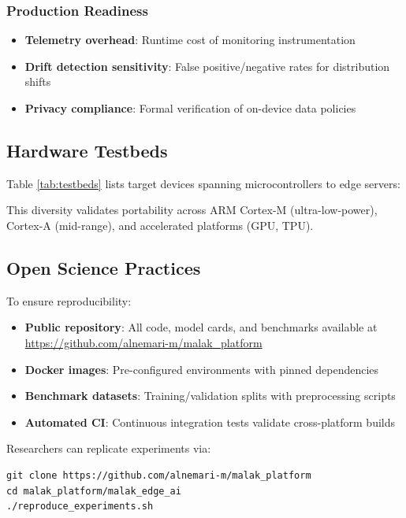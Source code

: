\subsubsection{Production Readiness}
\begin{itemize}
\item \textbf{Telemetry overhead}: Runtime cost of monitoring instrumentation
\item \textbf{Drift detection sensitivity}: False positive/negative rates for distribution shifts
\item \textbf{Privacy compliance}: Formal verification of on-device data policies
\end{itemize}

\subsection{Hardware Testbeds}

Table \ref{tab:testbeds} lists target devices spanning microcontrollers to edge servers:

\begin{table}[h]
\centering
\caption{Hardware Testbeds for Evaluation}
\label{tab:testbeds}
\end{table}

This diversity validates portability across ARM Cortex-M (ultra-low-power), Cortex-A (mid-range), and accelerated platforms (GPU, TPU).

\subsection{Open Science Practices}

To ensure reproducibility:
\begin{itemize}
\item \textbf{Public repository}: All code, model cards, and benchmarks available at \url{https://github.com/alnemari-m/malak_platform}
\item \textbf{Docker images}: Pre-configured environments with pinned dependencies
\item \textbf{Benchmark datasets}: Training/validation splits with preprocessing scripts
\item \textbf{Automated CI}: Continuous integration tests validate cross-platform builds
\end{itemize}

Researchers can replicate experiments via:
\begin{verbatim}
git clone https://github.com/alnemari-m/malak_platform
cd malak_platform/malak_edge_ai
./reproduce_experiments.sh
\end{verbatim}

